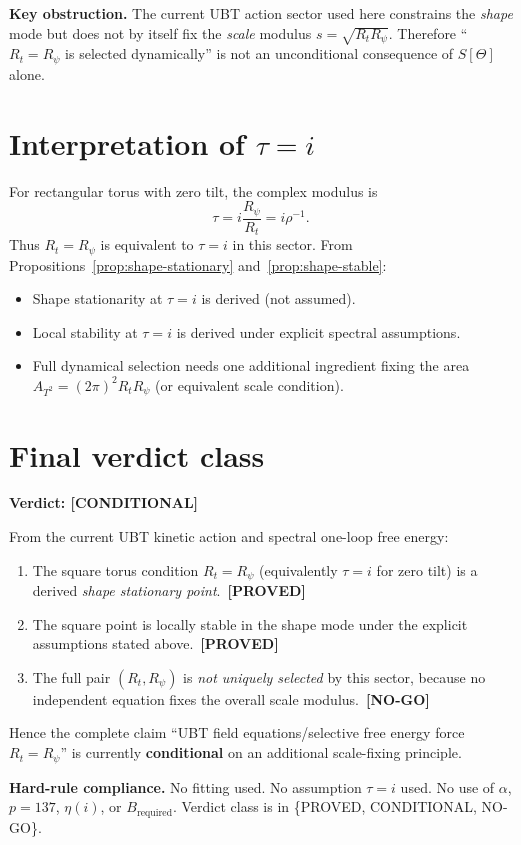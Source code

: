 \documentclass[12pt,a4paper]{article}
\theoremstyle{definition}
\theoremstyle{remark}
\newcommand{\PROVED}{\textcolor{green!50!black}{\textbf{[PROVED]}}}
\newcommand{\COND}{\textcolor{blue!70!black}{\textbf{[CONDITIONAL]}}}
\newcommand{\NOGO}{\textcolor{red!80!black}{\textbf{[NO-GO]}}}
\begin{document}
\begin{gapbox}
\textbf{Key obstruction.}
The current UBT action sector used here constrains the \emph{shape} mode but does
not by itself fix the \emph{scale} modulus $s=\sqrt{R_tR_\psi}$. Therefore
``$R_t=R_\psi$ is selected dynamically'' is not an unconditional consequence of
$S[\Theta]$ alone.
\end{gapbox}

\section{Interpretation of $\tau=i$}

For rectangular torus with zero tilt, the complex modulus is
\begin{equation}
\tau=i\frac{R_\psi}{R_t}=i\rho^{-1}.
\end{equation}
Thus $R_t=R_\psi$ is equivalent to $\tau=i$ in this sector.
From Propositions~\ref{prop:shape-stationary} and~\ref{prop:shape-stable}:

\begin{itemize}
\item Shape stationarity at $\tau=i$ is derived (not assumed).
\item Local stability at $\tau=i$ is derived under explicit spectral assumptions.
\item Full dynamical selection needs one additional ingredient fixing the area
$A_{T^2}=(2\pi)^2R_tR_\psi$ (or equivalent scale condition).
\end{itemize}

\section{Final verdict class}

\begin{resultbox}
\textbf{Verdict: \COND}

From the current UBT kinetic action and spectral one-loop free energy:
\begin{enumerate}
\item The square torus condition $R_t=R_\psi$ (equivalently $\tau=i$ for zero
tilt) is a derived \emph{shape stationary point}.\ \PROVED
\item The square point is locally stable in the shape mode under the explicit
assumptions stated above.\ \PROVED
\item The full pair $(R_t,R_\psi)$ is \emph{not uniquely selected} by this sector,
because no independent equation fixes the overall scale modulus.\ \NOGO
\end{enumerate}
Hence the complete claim ``UBT field equations/selective free energy force
$R_t=R_\psi$'' is currently \textbf{conditional} on an additional scale-fixing
principle.
\end{resultbox}

\begin{warnbox}
\textbf{Hard-rule compliance.}
No fitting used. No assumption $\tau=i$ used. No use of $\alpha$, $p=137$,
$\eta(i)$, or $B_{\mathrm{required}}$. Verdict class is in
\{PROVED, CONDITIONAL, NO-GO\}.
\end{warnbox}
\end{document}
